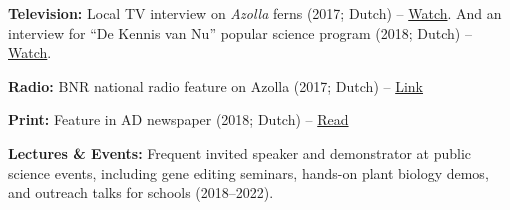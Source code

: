 \documentclass[a4paper,10pt]{article}
\begin{document}
\begin{description}
  \raggedright
  \item \textbf{Television:} Local TV interview on \textit{Azolla} ferns (2017; Dutch) 
    -- \href{https://youtu.be/OI4VV4M2-f4}{Watch}. 
    And an interview for “De Kennis van Nu” popular science program (2018; Dutch) 
    -- \href{https://ntr.nl/Focus/287/detail/Onkruid-als-reddende-engel/VPWON_1292624}{Watch}.
  \item \textbf{Radio:} BNR national radio feature on Azolla (2017; Dutch) 
    -- \href{https://www.bnr.nl/podcast/wetenschap-vandaag/10346708/utrechts-plantje-geniet-wereldwijde-faam}{Link}
  \item \textbf{Print:} Feature in AD newspaper (2018; Dutch) 
    -- \href{https://www.ad.nl/utrecht/kroosachtig-plantje-uit-sloot-naast-galgenwaard-blijkt-ware-eiwitbom~a1eaba6d/}{Read}
  \item \textbf{Lectures \& Events:} Frequent invited speaker and demonstrator at public science events,
    including gene editing seminars, hands-on plant biology demos, 
    and outreach talks for schools (2018–2022).
\end{description}


\end{document}
